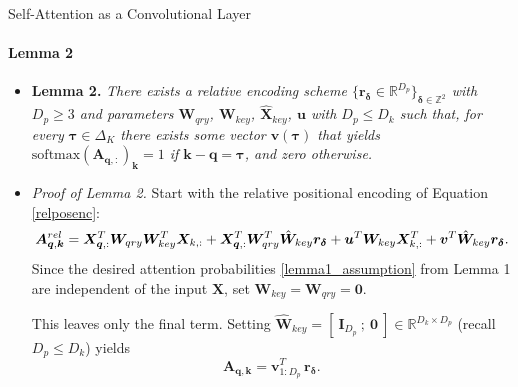 \documentclass[9pt]{beamer}
\newcommand{\bb}{\mathbb}
\newcommand{\mb}{\bm}
\begin{document}
\newcommand{\brac}[1]{^{(#1)}}
\begin{frame}{Self-Attention as a Convolutional Layer}
\framesubtitle{Lemma 2}
\begin{itemize}
\item \textbf{Lemma 2.} {\em There exists a relative encoding scheme $\{\bm r_{\bm \delta} \in \bb R^{D_p}\}_{\bm \delta\in\bb Z^2}$ with $D_p\geq 3$ and parameters $\bm W_{qry}$, $\bm W_{key}$, $\hat{\bm X}_{key}$, $\bm u$ with $D_p\leq D_k$ such that, for every $\bm\tau \in \Delta_K$ there exists some vector $\bm v(\bm\tau)$ that yields $\mathrm{softmax}(\bm A_{\bm q,:})_{\bm k}=1$ if $\bm k - \bm q = \bm\tau$, and zero otherwise.}

\vspace{.1in}
\item \textit{Proof of Lemma 2.} Start with the relative positional encoding of Equation \eqref{relposenc}:
\begin{equation*}
    \mb A^{rel}_{\mb q, \mb k} = 
        \mb X_{\mb q,:}^T \WW \mb X_{k,:}
        + \mb X_{\mb q,:}^T \mb W_{qry}^T\hat{\mb W}_{key} \mb r_{\mb \delta}
        + \mb u^T \mb W_{key} \mb X^T_{k,:}
        + \mb v^T \hat{\mb W}_{key} \mb r_{\bm\delta}.
\end{equation*}
Since the desired attention probabilities \eqref{lemma1_assumption} from Lemma 1 are independent of the input $\bm X$, set $\bm W_{key}=\bm W_{qry} = \bm 0$. 

\vspace{.1in}
This leaves only the final term. Setting $\hat{\bm W}_{key} = [\ \bm I_{D_p}\ ; \ \bm 0\ ] \in \mathbb R^{D_k\times D_p}$ (recall $D_p\leq D_k$) yields
\begin{equation*}
    \mb A_{\mb q, \mb k} = \mb v_{1:D_p}^T\, \mb r_{\bm\delta}.
\end{equation*}
\end{itemize}
\end{frame}
\end{document}
